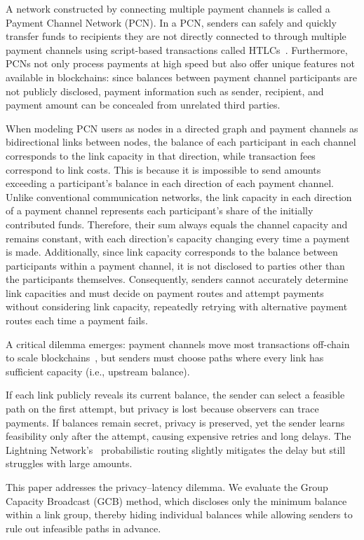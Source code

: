 \documentclass[conference]{IEEEtran}
\begin{document}
A network constructed by connecting multiple payment channels is called a Payment Channel Network (PCN).
In a PCN, senders can safely and quickly transfer funds to recipients they are not directly connected to through multiple payment channels using script-based transactions called HTLCs~\cite{poon_dryja_2016}.
Furthermore, PCNs not only process payments at high speed but also offer unique features not available in blockchains: since balances between payment channel participants are not publicly disclosed, payment information such as sender, recipient, and payment amount can be concealed from unrelated third parties.

When modeling PCN users as nodes in a directed graph and payment channels as bidirectional links between nodes, the balance of each participant in each channel corresponds to the link capacity in that direction, while transaction fees correspond to link costs. This is because it is impossible to send amounts exceeding a participant's balance in each direction of each payment channel.
Unlike conventional communication networks, the link capacity in each direction of a payment channel represents each participant's share of the initially contributed funds. Therefore, their sum always equals the channel capacity and remains constant, with each direction's capacity changing every time a payment is made.
Additionally, since link capacity corresponds to the balance between participants within a payment channel, it is not disclosed to parties other than the participants themselves.
Consequently, senders cannot accurately determine link capacities and must decide on payment routes and attempt payments without considering link capacity, repeatedly retrying with alternative payment routes each time a payment fails.

A critical dilemma emerges: payment channels move most transactions off-chain to scale blockchains~\cite{poon_dryja_2016}, but senders must choose paths where every link has sufficient capacity (i.e., upstream balance).

If each link publicly reveals its current balance, the sender can select a feasible path on the first attempt, but privacy is lost because observers can trace payments.
If balances remain secret, privacy is preserved, yet the sender learns feasibility only after the attempt, causing expensive retries and long delays.
The Lightning Network's~\cite{lnbolt} probabilistic routing slightly mitigates the delay but still struggles with large amounts.

This paper addresses the privacy–latency dilemma.
We evaluate the Group Capacity Broadcast (GCB) method, which discloses only the minimum balance within a link group, thereby hiding individual balances while allowing senders to rule out infeasible paths in advance.
\end{document}
